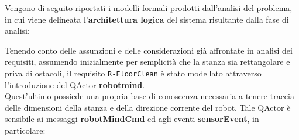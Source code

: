 \documentclass{llncs}
\newcommand{\code}[1]{{\color{blue}\small{\texttt{#1}}}}
\begin{document}
Vengono di seguito riportati i modelli formali prodotti dall'analisi del problema, in cui viene delineata l'\textbf{architettura logica} del sistema risultante dalla fase di analisi: 




Tenendo conto delle assunzioni e delle considerazioni già affrontate in analisi dei requisiti, assumendo inizialmente per semplicità che la stanza sia rettangolare e priva di ostacoli, il requisito \code{R-FloorClean} è stato modellato attraverso l'introduzione del QActor \textbf{robotmind}. \\ Quest'ultimo possiede una propria base di conoscenza necessaria a tenere traccia delle dimensioni della stanza e della direzione corrente del robot. Tale QActor è sensibile ai messaggi \textbf{robotMindCmd} ed agli eventi \textbf{sensorEvent}, in particolare:
\end{document}

